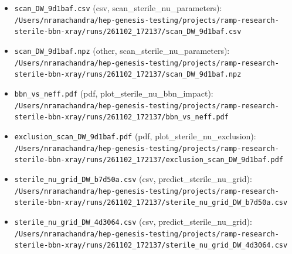 \documentclass[11pt,a4paper]{article}
\begin{document}
\begin{itemize}
  \item \texttt{scan\_\allowbreak{}DW\_\allowbreak{}9d1baf.csv} (csv, scan\_sterile\_nu\_parameters): \texttt{/\allowbreak{}Users/\allowbreak{}nramachandra/\allowbreak{}hep-genesis-testing/\allowbreak{}projects/\allowbreak{}ramp-research-sterile-bbn-xray/\allowbreak{}runs/\allowbreak{}261102\_\allowbreak{}172137/\allowbreak{}scan\_\allowbreak{}DW\_\allowbreak{}9d1baf.csv}
  \item \texttt{scan\_\allowbreak{}DW\_\allowbreak{}9d1baf.npz} (other, scan\_sterile\_nu\_parameters): \texttt{/\allowbreak{}Users/\allowbreak{}nramachandra/\allowbreak{}hep-genesis-testing/\allowbreak{}projects/\allowbreak{}ramp-research-sterile-bbn-xray/\allowbreak{}runs/\allowbreak{}261102\_\allowbreak{}172137/\allowbreak{}scan\_\allowbreak{}DW\_\allowbreak{}9d1baf.npz}
  \item \texttt{bbn\_\allowbreak{}vs\_\allowbreak{}neff.pdf} (pdf, plot\_sterile\_nu\_bbn\_impact): \texttt{/\allowbreak{}Users/\allowbreak{}nramachandra/\allowbreak{}hep-genesis-testing/\allowbreak{}projects/\allowbreak{}ramp-research-sterile-bbn-xray/\allowbreak{}runs/\allowbreak{}261102\_\allowbreak{}172137/\allowbreak{}bbn\_\allowbreak{}vs\_\allowbreak{}neff.pdf}
  \item \texttt{exclusion\_\allowbreak{}scan\_\allowbreak{}DW\_\allowbreak{}9d1baf.pdf} (pdf, plot\_sterile\_nu\_exclusion): \texttt{/\allowbreak{}Users/\allowbreak{}nramachandra/\allowbreak{}hep-genesis-testing/\allowbreak{}projects/\allowbreak{}ramp-research-sterile-bbn-xray/\allowbreak{}runs/\allowbreak{}261102\_\allowbreak{}172137/\allowbreak{}exclusion\_\allowbreak{}scan\_\allowbreak{}DW\_\allowbreak{}9d1baf.pdf}
  \item \texttt{sterile\_\allowbreak{}nu\_\allowbreak{}grid\_\allowbreak{}DW\_\allowbreak{}b7d50a.csv} (csv, predict\_sterile\_nu\_grid): \texttt{/\allowbreak{}Users/\allowbreak{}nramachandra/\allowbreak{}hep-genesis-testing/\allowbreak{}projects/\allowbreak{}ramp-research-sterile-bbn-xray/\allowbreak{}runs/\allowbreak{}261102\_\allowbreak{}172137/\allowbreak{}sterile\_\allowbreak{}nu\_\allowbreak{}grid\_\allowbreak{}DW\_\allowbreak{}b7d50a.csv}
  \item \texttt{sterile\_\allowbreak{}nu\_\allowbreak{}grid\_\allowbreak{}DW\_\allowbreak{}4d3064.csv} (csv, predict\_sterile\_nu\_grid): \texttt{/\allowbreak{}Users/\allowbreak{}nramachandra/\allowbreak{}hep-genesis-testing/\allowbreak{}projects/\allowbreak{}ramp-research-sterile-bbn-xray/\allowbreak{}runs/\allowbreak{}261102\_\allowbreak{}172137/\allowbreak{}sterile\_\allowbreak{}nu\_\allowbreak{}grid\_\allowbreak{}DW\_\allowbreak{}4d3064.csv}

\end{itemize}
\end{document}
